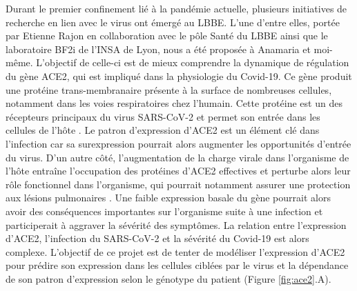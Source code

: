 Durant le premier confinement lié à la pandémie actuelle, plusieurs initiatives de recherche en lien avec le virus ont émergé au LBBE. L’une d’entre elles, portée par Etienne Rajon en collaboration avec le pôle Santé du LBBE ainsi que le laboratoire BF2i de l'INSA de Lyon, nous a été proposée à Anamaria et moi-même. L'objectif de celle-ci est de mieux comprendre la dynamique de régulation du gène ACE2, qui est impliqué dans la physiologie du Covid-19. Ce gène produit une protéine trans-membranaire présente à la surface de nombreuses cellules, notamment dans les voies respiratoires chez l’humain. Cette protéine est un des récepteurs principaux du virus SARS-CoV-2 et permet son entrée dans les cellules de l’hôte \citep{hoffmann_sars-cov-2_2020}. Le patron d’expression d’ACE2 est un élément clé dans l’infection car sa surexpression pourrait alors augmenter les opportunités d’entrée du virus. D’un autre côté, l’augmentation de la charge virale dans l’organisme de l’hôte entraîne l’occupation des protéines d’ACE2 effectives et perturbe alors leur rôle fonctionnel dans l’organisme, qui pourrait notamment assurer une protection aux lésions pulmonaires \citep{imai_angiotensin-converting_2005}. Une faible expression basale du gène pourrait alors avoir des conséquences importantes sur l’organisme suite à une infection et participerait à aggraver la sévérité des symptômes. La relation entre l’expression d’ACE2, l’infection du SARS-CoV-2 et la sévérité du Covid-19 est alors complexe. L’objectif de ce projet est de tenter de modéliser l’expression d’ACE2 pour prédire son expression dans les cellules ciblées par le virus et la dépendance de son patron d’expression selon le génotype du patient (Figure \ref{fig:ace2}.A). \\

